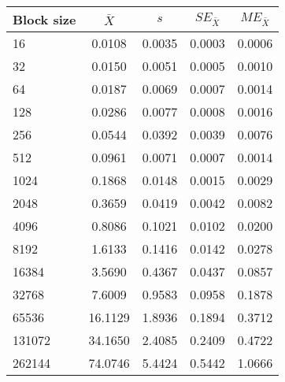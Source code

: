\begin{tabular}{lcccc}\toprule
{\small Block size} & $\bar{X}$ & $s$ & $SE_{\bar{X}}$ & $ME_{\bar{X}}$ \\\midrule
16 & 0.0108 & 0.0035 & 0.0003 & 0.0006\\
32 & 0.0150 & 0.0051 & 0.0005 & 0.0010\\
64 & 0.0187 & 0.0069 & 0.0007 & 0.0014\\
128 & 0.0286 & 0.0077 & 0.0008 & 0.0016\\
256 & 0.0544 & 0.0392 & 0.0039 & 0.0076\\
512 & 0.0961 & 0.0071 & 0.0007 & 0.0014\\
1024 & 0.1868 & 0.0148 & 0.0015 & 0.0029\\
2048 & 0.3659 & 0.0419 & 0.0042 & 0.0082\\
4096 & 0.8086 & 0.1021 & 0.0102 & 0.0200\\
8192 & 1.6133 & 0.1416 & 0.0142 & 0.0278\\
16384 & 3.5690 & 0.4367 & 0.0437 & 0.0857\\
32768 & 7.6009 & 0.9583 & 0.0958 & 0.1878\\
65536 & 16.1129 & 1.8936 & 0.1894 & 0.3712\\
131072 & 34.1650 & 2.4085 & 0.2409 & 0.4722\\
262144 & 74.0746 & 5.4424 & 0.5442 & 1.0666\\
\bottomrule
\end{tabular}
